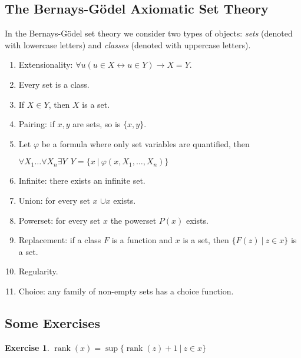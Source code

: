 \documentclass[8pt]{article}
\theoremstyle{definition}
\theoremstyle{definition}
\theoremstyle{definition}
\theoremstyle{definition}
\theoremstyle{definition}
\theoremstyle{definition}
\theoremstyle{definition}
\theoremstyle{definition}
\theoremstyle{definition}
\theoremstyle{definition}
\theoremstyle{definition}
\theoremstyle{definition}
\theoremstyle{definition}
\newtheorem{exercise}{Exercise}[section]
\theoremstyle{definition}
\theoremstyle{question}
\begin{document}
\subsection{The Bernays-G\"{o}del Axiomatic Set Theory}

In the Bernays-G\"{o}del set theory we consider two types of objects: \emph{sets} (denoted with lowercase letters) and 
\emph{classes} (denoted with uppercase letters).

\begin{enumerate}
  \item Extensionality: $\forall u (u \in X \leftrightarrow u \in Y) \to X = Y$.
  \item Every set is a class.
  \item If $X \in Y$, then $X$ is a set.
  \item Pairing: if $x, y$ are sets, so is $\{x, y\}$.
  \item Let $\varphi$ be a formula where only set variables are quantified, then
  \begin{center}
    $\forall X_1 \dots \forall X_n \exists Y \:\: Y = \{ x \: | \: \varphi(x, X_1, \dots, X_n )\}$
  \end{center}
  \item Infinite: there exists an infinite set.
  \item Union: for every set $x$ $\cup x$ exists.
  \item Powerset: for every set $x$ the powerset $P(x)$ exists.
  \item Replacement: if a class $F$ is a function and $x$ is a set, then $\{ F(z) \: | \: z \in x \}$ is a set.
  \item Regularity.
  \item Choice: any family of non-empty sets has a choice function.
\end{enumerate}

\subsection{Some Exercises}

\begin{exercise}
  $\operatorname{rank}(x) = \sup \{ \operatorname{rank}(z) + 1 \: | \: z \in x \}$
\end{exercise}
\end{document}
